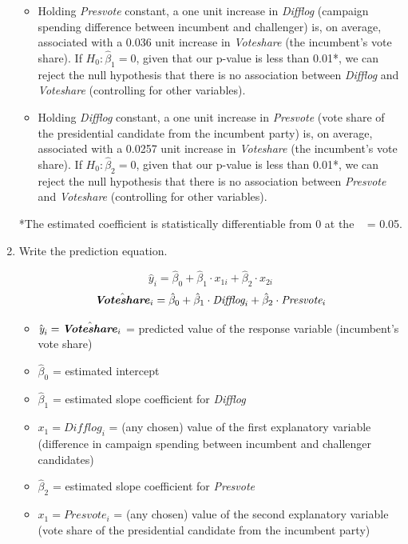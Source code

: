 \documentclass[12pt,letterpaper]{article}
\begin{document}
\begin{enumerate}
\begin{itemize}
	\item Holding \textit{Presvote }constant, a one unit increase in \textit{Difflog } (campaign spending difference between incumbent and challenger) is, on average, associated with a 0.036 unit increase in \textit{Voteshare } (the incumbent's vote share). If \(H_0: \hat{\beta}_1 = 0\), given that our p-value is less than 0.01*, we can reject the null hypothesis that there is no association between \textit{Difflog} and \textit{Voteshare} (controlling for other variables).
	\item Holding \textit{Difflog} constant, a one unit increase in \textit{Presvote} (vote share of the presidential candidate from the incumbent party) is, on average, associated with a 0.0257 unit increase in \textit{Voteshare } (the incumbent's vote share). If \(H_0: \hat{\beta}_2 = 0\), given that our p-value is less than 0.01*, we can reject the null hypothesis that there is no association between \textit{Presvote} and \textit{Voteshare} (controlling for other variables).
\end{itemize}

*The estimated coefficient is statistically differentiable from 0 at the \alpha \  = 0.05.

		\item Write the prediction equation.
			\begin{center}
			\[
			\hat{y}_i = \hat{\beta}_0 + \hat{\beta}_1 \cdot x_{1i} + \hat{\beta}_2 \cdot x_{2i}
			\]
\[
\hat{\textbf{\textit{Voteshare}}}_i = \hat{\beta}_0 + \hat{\beta}_1 \cdot \textit{\text{Difflog}}_i + \hat{\beta}_2 \cdot \textit{\text{Presvote}}_i
\]

		\end{center}
		
		\begin{flushleft}
			
			\begin{itemize}
				\item $\hat{\textit{y}}_i = \hat{\textbf{\textit{Voteshare}}}_i$ = predicted value of the response variable (incumbent's vote share)
				\item $\hat{\beta}_0$ = estimated intercept
				\item $\hat{\beta}_1$ = estimated slope coefficient for \textit{Difflog}
				\item $x_ 1= \textit{Difflog}_i$ = (any chosen) value of the first explanatory variable (difference in campaign spending between incumbent and challenger candidates)
				\item $\hat{\beta}_2$ = estimated slope coefficient for \textit{Presvote}
				\item $x_ 1= \textit{Presvote}_i$ = (any chosen) value of the second explanatory variable (vote share of the presidential candidate from the incumbent party)
			\end{itemize}
			

\end{flushleft}
\end{enumerate}
\end{document}
